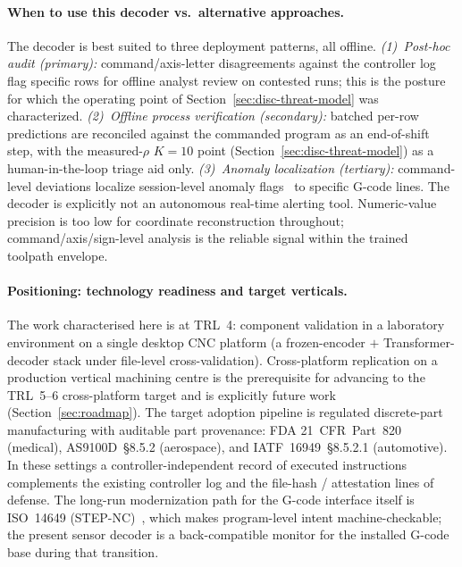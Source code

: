 \documentclass[sensors,article,submit,moreauthors,pdftex]{Definitions/mdpi}
\begin{document}
\paragraph{When to use this decoder vs.\ alternative approaches.}\label{sec:disc-when-to-use} The decoder is best suited to three deployment patterns, all offline. \emph{(1)~Post-hoc audit (primary):} command/axis-letter disagreements against the controller log flag specific rows for offline analyst review on contested runs; this is the posture for which the operating point of Section~\ref{sec:disc-threat-model} was characterized. \emph{(2)~Offline process verification (secondary):} batched per-row predictions are reconciled against the commanded program as an end-of-shift step, with the measured-$\rho$ $K\!=\!10$ point (Section~\ref{sec:disc-threat-model}) as a human-in-the-loop triage aid only. \emph{(3)~Anomaly localization (tertiary):} command-level deviations localize session-level anomaly flags~\cite{coelho2024anomaly,kimmell2025cnc} to specific G-code lines. The decoder is explicitly not an autonomous real-time alerting tool. Numeric-value precision is too low for coordinate reconstruction throughout; command/axis/sign-level analysis is the reliable signal within the trained toolpath envelope.

\paragraph{Positioning: technology readiness and target verticals.} The work characterised here is at TRL~4: component validation in a laboratory environment on a single desktop CNC platform (a frozen-encoder $+$ Transformer-decoder stack under file-level cross-validation). Cross-platform replication on a production vertical machining centre is the prerequisite for advancing to the TRL~5--6 cross-platform target and is explicitly future work (Section~\ref{sec:roadmap}). The target adoption pipeline is regulated discrete-part manufacturing with auditable part provenance: FDA 21~CFR~Part~820 (medical), AS9100D~\S{}8.5.2 (aerospace), and IATF~16949~\S{}8.5.2.1 (automotive). In these settings a controller-independent record of executed instructions complements the existing controller log and the file-hash / attestation lines of defense. The long-run modernization path for the G-code interface itself is ISO~14649 (STEP-NC)~\cite{iso14649}, which makes program-level intent machine-checkable; the present sensor decoder is a back-compatible monitor for the installed G-code base during that transition.
\end{document}
